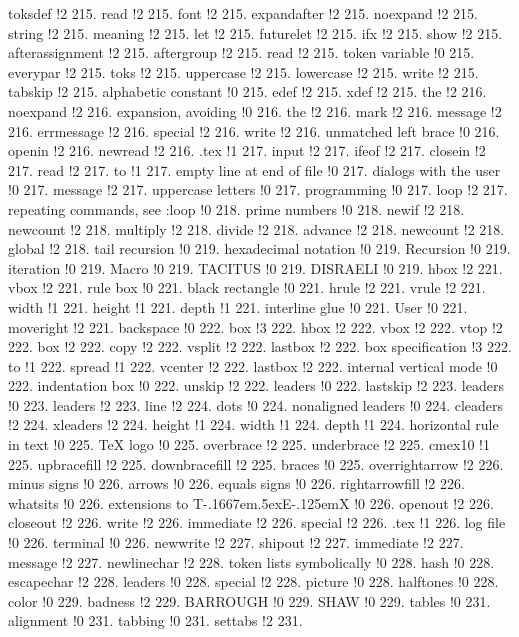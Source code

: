 toksdef !2 215.
read !2 215.
font !2 215.
expandafter !2 215.
noexpand !2 215.
string !2 215.
meaning !2 215.
let !2 215.
futurelet !2 215.
ifx !2 215.
show !2 215.
afterassignment !2 215.
aftergroup !2 215.
read !2 215.
token variable !0 215.
everypar !2 215.
toks !2 215.
uppercase !2 215.
lowercase !2 215.
write !2 215.
tabskip !2 215.
alphabetic constant !0 215.
edef !2 215.
xdef !2 215.
the !2 216.
noexpand !2 216.
expansion, avoiding !0 216.
the !2 216.
mark !2 216.
message !2 216.
errmessage !2 216.
special !2 216.
write !2 216.
unmatched left brace !0 216.
openin !2 216.
newread !2 216.
.tex !1 217.
input !2 217.
ifeof !2 217.
closein !2 217.
read !2 217.
to !1 217.
empty line at end of file !0 217.
dialogs with the user !0 217.
message !2 217.
uppercase letters !0 217.
programming !0 217.
loop !2 217.
repeating commands, see :loop !0 218.
prime numbers !0 218.
newif !2 218.
newcount !2 218.
multiply !2 218.
divide !2 218.
advance !2 218.
newcount !2 218.
global !2 218.
tail recursion !0 219.
hexadecimal notation !0 219.
Recursion !0 219.
iteration !0 219.
Macro !0 219.
TACITUS !0 219.
DISRAELI !0 219.
hbox !2 221.
vbox !2 221.
rule box !0 221.
black rectangle !0 221.
hrule !2 221.
vrule !2 221.
width !1 221.
height !1 221.
depth !1 221.
interline glue !0 221.
User !0 221.
moveright !2 221.
backspace !0 222.
box !3 222.
hbox !2 222.
vbox !2 222.
vtop !2 222.
box !2 222.
copy !2 222.
vsplit !2 222.
lastbox !2 222.
box specification !3 222.
to !1 222.
spread !1 222.
vcenter !2 222.
lastbox !2 222.
internal vertical mode !0 222.
indentation box !0 222.
unskip !2 222.
leaders !0 222.
lastskip !2 223.
leaders !0 223.
leaders !2 223.
line !2 224.
dots !0 224.
nonaligned leaders !0 224.
cleaders !2 224.
xleaders !2 224.
height !1 224.
width !1 224.
depth !1 224.
horizontal rule in text !0 225.
TeX logo !0 225.
overbrace !2 225.
underbrace !2 225.
cmex10 !1 225.
upbracefill !2 225.
downbracefill !2 225.
braces !0 225.
overrightarrow !2 226.
minus signs !0 226.
arrows !0 226.
equals signs !0 226.
rightarrowfill !2 226.
whatsits !0 226.
extensions to T\kern -.1667em\lower .5ex\hbox {E}\kern -.125emX !0 226.
openout !2 226.
closeout !2 226.
write !2 226.
immediate !2 226.
special !2 226.
.tex !1 226.
log file !0 226.
terminal !0 226.
newwrite !2 227.
shipout !2 227.
immediate !2 227.
message !2 227.
newlinechar !2 228.
token lists symbolically !0 228.
hash !0 228.
escapechar !2 228.
leaders !0 228.
special !2 228.
picture !0 228.
halftones !0 228.
color !0 229.
badness !2 229.
BARROUGH !0 229.
SHAW !0 229.
tables !0 231.
alignment !0 231.
tabbing !0 231.
settabs !2 231.
